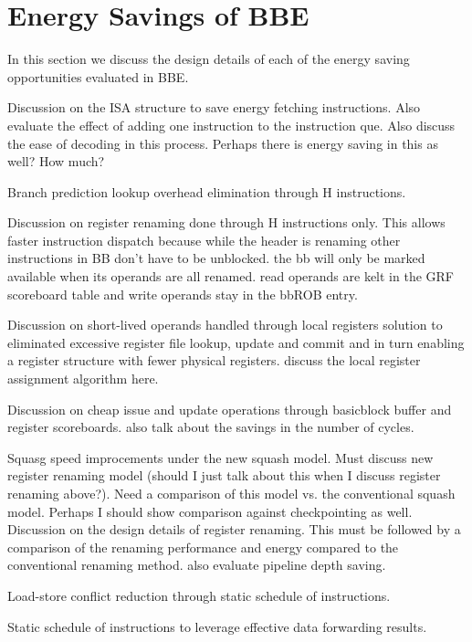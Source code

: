 \section{Energy Savings of BBE}
\label{sec:energy_sav}

In this section we discuss the design details of each of the energy saving
opportunities evaluated in BBE.

Discussion on the ISA structure to save energy fetching instructions. Also
evaluate the effect of adding one instruction to the instruction que. Also
discuss the ease of decoding in this process. Perhaps there is energy saving in
this as well? How much?

Branch prediction lookup overhead elimination through H instructions.

Discussion on register renaming done through H instructions only. This allows
faster instruction dispatch because while the header is renaming other
instructions in BB don't have to be unblocked. the bb will only be marked
available when its operands are all renamed. read operands are kelt in the GRF
scoreboard table and write operands stay in the bbROB entry.

Discussion on short-lived operands handled through local registers solution to
eliminated excessive register file lookup, update and commit and in turn
enabling a register structure with fewer physical registers. discuss the local
register assignment algorithm here.

Discussion on cheap issue and update operations through basicblock buffer and
register scoreboards. also talk about the savings in the number of cycles.

Squasg speed improcements under the new squash model. Must discuss new register
renaming model (should I just talk about this when I discuss register renaming
        above?). Need a comparison of this model vs. the conventional squash
model. Perhaps I should show comparison against checkpointing as well.
Discussion on the design details of register renaming. This must be followed by
a comparison of the renaming performance and energy compared to the conventional
renaming method. also evaluate pipeline depth saving.

Load-store conflict reduction through static schedule of instructions.

Static schedule of instructions to leverage effective data forwarding results.
